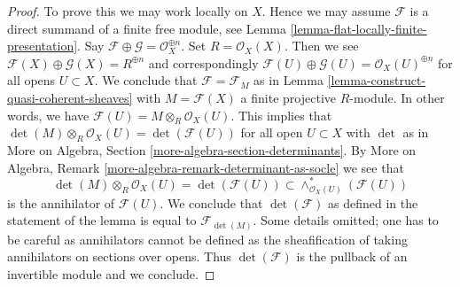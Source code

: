\documentclass[10pt,a4paper]{amsart}
\theoremstyle{plain}
\theoremstyle{definition}
\theoremstyle{remark}
\numberwithin{equation}{subsection}
\begin{document}
\begin{proof}
To prove this we may work locally on $X$. Hence we may assume $\mathcal{F}$
is a direct summand of a finite free module, see
Lemma \ref{lemma-flat-locally-finite-presentation}. Say
$\mathcal{F} \oplus \mathcal{G} = \mathcal{O}_X^{\oplus n}$.
Set $R = \mathcal{O}_X(X)$. Then we see
$\mathcal{F}(X) \oplus \mathcal{G}(X) = R^{\oplus n}$
and correspondingly
$\mathcal{F}(U) \oplus \mathcal{G}(U) = \mathcal{O}_X(U)^{\oplus n}$
for all opens $U \subset X$.
We conclude that $\mathcal{F} = \mathcal{F}_M$ as in
Lemma \ref{lemma-construct-quasi-coherent-sheaves}
with $M = \mathcal{F}(X)$ a finite projective $R$-module.
In other words, we have $\mathcal{F}(U) = M \otimes_R \mathcal{O}_X(U)$.
This implies that
$\det(M) \otimes_R \mathcal{O}_X(U) = \det(\mathcal{F}(U))$
for all open $U \subset X$ with $\det$ as in
More on Algebra, Section \ref{more-algebra-section-determinants}. By
More on Algebra, Remark \ref{more-algebra-remark-determinant-as-socle}
we see that
$$
\det(M) \otimes_R \mathcal{O}_X(U) =
\det(\mathcal{F}(U)) \subset
\wedge^*_{\mathcal{O}_X(U)}(\mathcal{F}(U))
$$
is the annihilator of $\mathcal{F}(U)$. We conclude that
$\det(\mathcal{F})$ as defined in the statement of the lemma
is equal to $\mathcal{F}_{\det(M)}$. Some details omitted; one has
to be careful as annihilators cannot be defined as the sheafification
of taking annihilators on sections over opens. Thus $\det(\mathcal{F})$
is the pullback of an invertible module and we conclude.
\end{proof}
\end{document}
